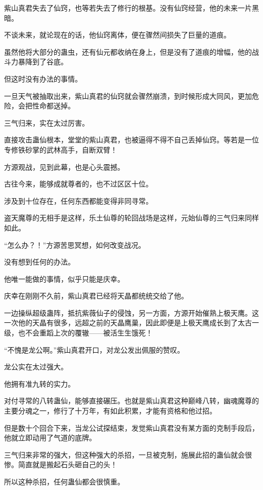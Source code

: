 
\begin{this_body}

紫山真君失去了仙窍，也等若失去了修行的根基。没有仙窍经营，他的未来一片黑暗。

不谈未来，就论现在的话，他仙窍离体，便在骤然间损失了巨量的道痕。

虽然他将大部分的蛊虫，还有仙元都收纳在身上，但是没有了道痕的增幅，他的战斗力暴降到了谷底。

但这时没有办法的事情。

一旦天气被抽取出来，紫山真君的仙窍就会骤然崩溃，到时候形成大同风，更加危险，会把性命都送掉。

三气归来，实在太过厉害。

直接攻击蛊仙根本，堂堂的紫山真君，也被逼得不得不自己丢掉仙窍。等若是一位专修铁砂掌的武林高手，自断双臂！

方源观战，见到此幕，也是心头震撼。

古往今来，能够成就尊者的，也不过区区十位。

涉及到十位存在，任何东西都能变得非同寻常。

盗天魔尊的无相手是这样，乐土仙尊的轮回战场是这样，元始仙尊的三气归来同样如此。

“怎么办？！”方源苦思冥想，如何改变战况。

没有想到任何的办法。

他唯一能做的事情，似乎只能是庆幸。

庆幸在刚刚不久前，紫山真君已经将天晶都统统交给了他。

一边操纵超级蛊阵，抵抗紫薇仙子的侵蚀，另一方面，方源开始催熟上极天鹰。这一次他的天晶有很多，远超之前的天晶鹰巢，因此即便是上极天鹰成长到了太古一级，也不会重蹈上次的覆辙——被活生生饿死！

“不愧是龙公啊。”紫山真君开口，对龙公发出佩服的赞叹。

龙公实在太过强大。

他拥有准九转的实力。

对付寻常的八转蛊仙，能够直接碾压。也就是紫山真君这种巅峰八转，幽魂魔尊的主要分魂之一，修行了十万年，有如此积累，才能有资格和他过招。

但是数十个回合下来，当龙公试探结束，发觉紫山真君没有某方面的克制手段后，他就立即动用了气道的底牌。

三气归来非常的强大，但这种强大的杀招，一旦被克制，施展此招的蛊仙就会很惨。简直就是搬起石头砸自己的头！

所以这种杀招，任何蛊仙都会很慎重。


\end{this_body}
